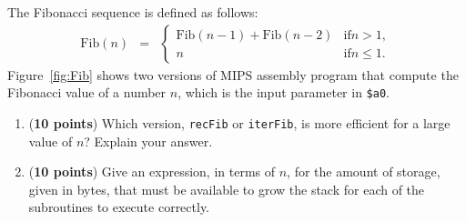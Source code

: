 \documentclass[psfig,11pt]{article}
\newif\ifsol
\begin{document}
\begin{question}[20] The Fibonacci sequence is defined as follows:
\begin{eqnarray}
\mathrm{Fib}(n) &=& \left\{
\begin{array}{cl}
\mathrm{Fib}(n-1) + \mathrm{Fib}(n-2) & \mathrm{if } n > 1,\\ \nonumber
n & \mathrm{if } n \leq 1. \nonumber
\end{array} \right. \nonumber
\end{eqnarray}
Figure~\ref{fig:Fib} shows two versions of MIPS assembly program that compute the Fibonacci value of a number $n$, which is the input parameter in {\tt \$a0}.
\begin{enumerate}
\item({\bf 10 points}) Which version, {\tt recFib} or {\tt iterFib}, is more efficient for a large value of $n$? Explain your answer.

\ifsol
\color{red}
The iterative version is more efficient for two reasons.
\begin{enumerate}
\item It does not need to create a stack frame for the multiple calls of the function, and thus is not required to perform expensive memory (load and store) operations.
\item It does not repeat the computation of the Fibonacci of lower values. For instance, to compute the Fibonacci value of $n$ the recursive function calls itself twice: one time with parameter $n-1$ and another with parameter $n-2$. But the computation of $n-1$ will itself call {\tt recFib} with $n-2$, even though it had already been computed.
\end{enumerate}
\color{black}
\else
  \vspace{1.5in}
\fi

\item({\bf 10 points}) Give an expression, in terms of $n$, for the amount of storage, given in bytes, that must be available to grow the stack for each of the subroutines to execute correctly.


\end{enumerate}
\end{question}
\end{document}

